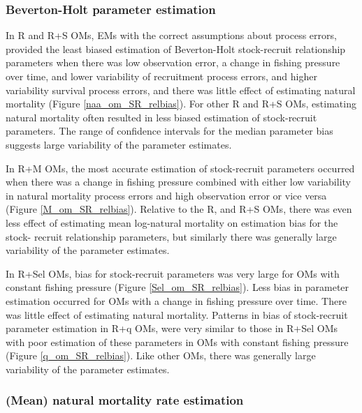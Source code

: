 \documentclass[
  12pt,
]{article}
\begin{document}
\hypertarget{beverton-holt-parameter-estimation}{%
\subsubsection*{Beverton-Holt parameter
estimation}\label{beverton-holt-parameter-estimation}}

In R and R+S OMs, EMs with the correct assumptions about process errors,
provided the least biased estimation of Beverton-Holt stock-recruit
relationship parameters when there was low observation error, a change
in fishing pressure over time, and lower variability of recruitment
process errors, and higher variability survival process errors, and
there was little effect of estimating natural mortality (Figure
\ref{naa_om_SR_relbias}). For other R and R+S OMs, estimating natural
mortality often resulted in less biased estimation of stock-recruit
parameters. The range of confidence intervals for the median parameter
bias suggests large variability of the parameter estimates.

In R+M OMs, the most accurate estimation of stock-recruit parameters
occurred when there was a change in fishing pressure combined with
either low variability in natural mortality process errors and high
observation error or vice versa (Figure \ref{M_om_SR_relbias}). Relative
to the R, and R+S OMs, there was even less effect of estimating mean
log-natural mortality on estimation bias for the stock- recruit
relationship parameters, but similarly there was generally large
variability of the parameter estimates.

In R+Sel OMs, bias for stock-recruit parameters was very large for OMs
with constant fishing pressure (Figure \ref{Sel_om_SR_relbias}). Less
bias in parameter estimation occurred for OMs with a change in fishing
pressure over time. There was little effect of estimating natural
mortality. Patterns in bias of stock-recruit parameter estimation in R+q
OMs, were very similar to those in R+Sel OMs with poor estimation of
these parameters in OMs with constant fishing pressure (Figure
\ref{q_om_SR_relbias}). Like other OMs, there was generally large
variability of the parameter estimates.

\hypertarget{mean-natural-mortality-rate-estimation}{%
\subsubsection*{(Mean) natural mortality rate
estimation}\label{mean-natural-mortality-rate-estimation}}
\end{document}
